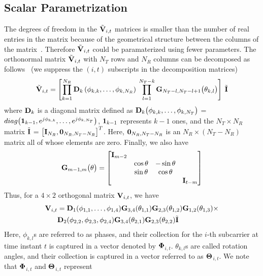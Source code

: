 \documentclass[journal,10pt,twocolumn]{IEEEtran}
\def\bD{{\bf D}}
\def\bG{{\bf G}}
\def\bI{{\bf I}}
\def\bV{{\bf V}}
\begin{document}
\subsection{Scalar Parametrization}
\label{givens}
The degrees of freedom in the $\tilde{\bV}_{i,t}$ matrices is smaller
than the number of real entries in the matrix because of the
geometrical structure between the columns of the
matrix~\cite{4114278}.  Therefore $\tilde{\bV}_{i,t}$ could be paramaterized
using fewer parameters.
The orthonormal matrix $\tilde{\bV}_{i,t}$ with
$N_T$ rows and $N_R$ columns can be decomposed as
follows~\cite{4114278} (we suppress the $(i, t)$ subscripts in the
decomposition matrices)
\begin{equation}
\tilde{\bV}_{i,t} = \left[\prod_{k=1}^{N_{R}} \bD_{k} \left( \phi_{k,k},\ldots , \phi_{k,N_{R}} \right) \:  \prod_{l=1}^{N_{T}-k} \bG_{N_{T}-l,N_{T} -l+1} \big( \theta_{k,l}\big)  \right] \: \tilde{\bI}
\end{equation}
where $\bD_{k}$ is a diagonal matrix defined as
$\bD_{k}\big(\phi_{k,k}, \ldots, \phi_{k,N_T } \big)$ =
$\mbox{diag}\big( {\bf 1}_{k-1}, e^{j\phi_{k,k}},\ldots,
e^{j\phi_{k,N_T }} \big)$, ${\bf 1}_{k-1}$ represents $k-1$ ones,
and the $N_T \times N_R$ matrix $\tilde{\bI}$ =
$\big[\bI_{N_R }, {\bf 0}_{N_R ,N_T -N_R}\big]^{T}$. Here,
${\bf 0}_{N_R ,N_T -N_R }$ is an $N_R\times (N_T - N_R)$ matrix all of
whose elements are zero. Finally, we also have
\begin{equation}
\bG_{m-1,m}\big(\theta\big)  =
\begin{bmatrix}
\bI_{m-2} & & & \\
& \cos\theta & -\sin\theta & \\
& \sin\theta & \cos\theta & \\
& & & \bI_{t-m}
\end{bmatrix}
\end{equation}
Thus, for a $4 \times 2$ orthogonal matrix $\bV_{i,t}$, we have
\begin{align*}
  \bV_{i,t} & =
  \bD_{1}(\phi_{1,1},\ldots,\phi_{1,4})\bG_{3,4}(\theta_{1,1})
  \bG_{2,3}(\theta_{1,2}) \bG_{1,2}(\theta_{1,3})\times\\
& \bD_{2}(\phi_{2,2},\phi_{2,3},\phi_{2,4}) \bG_{3,4}(\theta_{2,1}) \bG_{2,3}(\theta_{2,2})\tilde{\bI}
\end{align*}
Here, $\phi_{k,l}$s are referred to as phases, and their collection for
the $i$-th subcarrier at time instant $t$ is captured in a vector
denoted by $\bf{\Phi}$$_{i,t}$. $\theta_{k,l}$s are called rotation angles, and
their collection is captured in a vector referred to as
$\bf{\Theta}$$_{i,t}$. We note that $\bf{\Phi}$$_{i,t}$ and $\bf{\Theta}$$_{i,t}$ represent
\end{document}
